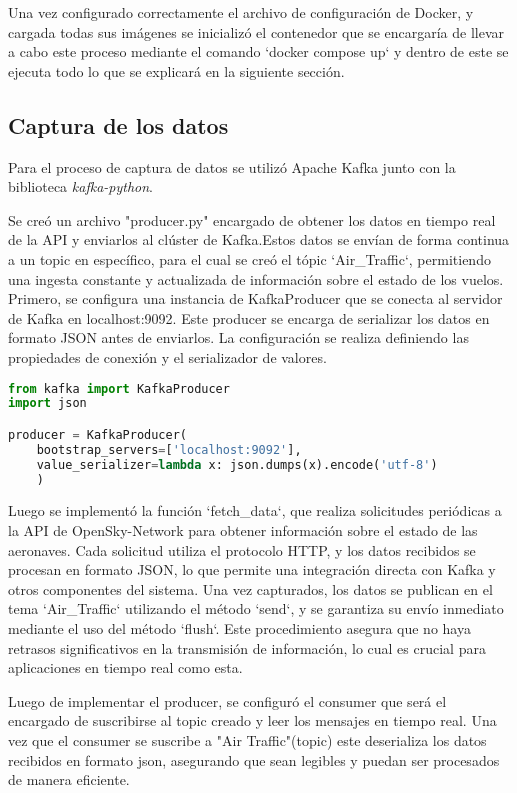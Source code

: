 \documentclass{article}
\begin{document}
Una vez configurado correctamente el archivo de configuración de Docker, y cargada todas sus imágenes se inicializó el contenedor que se encargaría de llevar a cabo este proceso mediante el comando `docker compose up` y dentro de este se ejecuta todo lo que se explicará en la siguiente sección.

\subsection{Captura de los datos}

Para el proceso de captura de datos se utilizó Apache Kafka junto con la biblioteca \textit{kafka-python}.

Se creó un archivo "producer.py" encargado de obtener los datos en tiempo real de la API  y enviarlos al clúster de Kafka.Estos datos se envían de forma continua a un topic en específico, para el cual se creó el tópic `Air\_Traffic`, permitiendo una ingesta constante y actualizada de información sobre el estado de los vuelos.
Primero, se configura una instancia de KafkaProducer que se conecta al servidor de Kafka en localhost:9092. Este producer se encarga de serializar los datos en formato JSON antes de enviarlos. La configuración se realiza definiendo las propiedades de conexión y el serializador de valores.

\begin{lstlisting}[language=Python]
from kafka import KafkaProducer
import json

producer = KafkaProducer(
    bootstrap_servers=['localhost:9092'],
    value_serializer=lambda x: json.dumps(x).encode('utf-8')
    )
\end{lstlisting}

Luego se implementó la función `fetch\_data`, que realiza solicitudes periódicas a la API de OpenSky-Network para obtener información sobre el estado de las aeronaves. Cada solicitud utiliza el protocolo HTTP, y los datos recibidos se procesan en formato JSON, lo que permite una integración directa con Kafka y otros componentes del sistema.
Una vez capturados, los datos se publican en el tema `Air\_Traffic` utilizando el método `send`, y se garantiza su envío inmediato mediante el uso del método `flush`. Este procedimiento asegura que no haya retrasos significativos en la transmisión de información, lo cual es crucial para aplicaciones en tiempo real como esta.

Luego de implementar el producer, se configuró el consumer que será el encargado de suscribirse al topic creado y leer los mensajes en tiempo real. Una vez que el consumer se suscribe a "Air Traffic"(topic) este deserializa los datos recibidos en formato json, asegurando que sean legibles y puedan ser procesados de manera eficiente.
\end{document}

